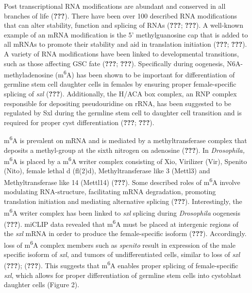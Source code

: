 \documentclass[12pt,oneside]{reedthesis}
\begin{document}
Post transcriptional RNA modifications are abundant and conserved in all
branches of life ({\textbf{???}}). There have been over 100 described RNA
modifications that can alter stability, function and splicing of RNAs
({\textbf{???}}; {\textbf{???}}). A well-known example of an mRNA
modification is the 5' methylguanosine cap that is added to all mRNAs to
promote their stability and aid in translation initiation
({\textbf{???}}; {\textbf{???}}). A variety of RNA modifications have
been linked to developmental transitions, such as those affecting GSC
fate ({\textbf{???}}; {\textbf{???}}). Specifically during oogenesis,
N6A-methyladenosine (m\textsuperscript{6}A) has been shown to be important for
differentiation of germline stem cell daughter cells in females by
ensuring proper female-specific splicing of \emph{sxl} ({\textbf{???}}).
Additionally, the H/ACA box complex, an RNP complex responsible for
depositing pseudouridine on rRNA, has been suggested to be regulated by
Sxl during the germline stem cell to daughter cell transition and is
required for proper cyst differentiation ({\textbf{???}}; {\textbf{???}}).

m\textsuperscript{6}A is prevalent on mRNA and is mediated by a methyltransferase
complex that deposits a methyl-group at the sixth nitrogen on adenosine
({\textbf{???}}). In \emph{Drosophila,} m\textsuperscript{6}A is placed by a m\textsuperscript{6}A writer
complex consisting of Xio, Virilizer (Vir), Spenito (Nito), female
lethal d (fl(2)d), Methyltransferase like 3 (Mettl3) and
Methyltransferase like 14 (Mettl14) ({\textbf{???}}). Some described roles
of m\textsuperscript{6}A involve modulating RNA-structure, facilitating mRNA
degradation, promoting translation initiation and mediating alternative
splicing ({\textbf{???}}). Interestingly, the m\textsuperscript{6}A writer complex
has been linked to \emph{sxl} splicing during \emph{Drosophila} oogenesis
({\textbf{???}}). miCLIP data revealed that m\textsuperscript{6}A must be placed at
intergenic regions of the \emph{sxl} mRNA in order to produce the
female-specific isoform ({\textbf{???}}). Accordingly. loss of m\textsuperscript{6}A
complex members such as \emph{spenito} result in expression of the male
specific isoform of \emph{sxl}, and tumors of undifferentiated cells, similar
to loss of \emph{sxl} ({\textbf{???}}); ({\textbf{???}}). This suggests that
m\textsuperscript{6}A enables proper splicing of female-specific \emph{sxl}, which allows for
proper differentiation of germline stem cells into cystoblast daughter
cells (Figure 2).
\end{document}
